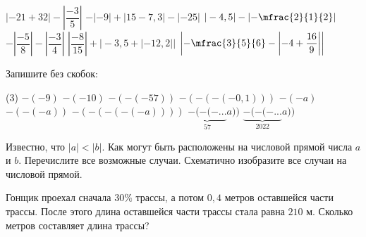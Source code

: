 \begin{class}[number=3]
\begin{listofex}[resume]
\begin{tasks}
			\task \( |-21+32| - \left|\dfrac{-3}{5}\right|  \)
			\task \( -|-9|+|15-7,3|-|-25|  \)
			\task \(  |-4,5|-\left|-\mfrac{2}{1}{2}\right| \)
			\task \(  -\left| \dfrac{-5}{8} \right|-\left|\dfrac{-3}{4}\right| \)
			\task \(  \left|\dfrac{-8}{15}\right| + \bigl|-3,5+|-12,2|| \)
			\task \(  \left|-\mfrac{3}{5}{6} - \left|-4+\dfrac{16}{9}\right|\right| \)
		\end{tasks}
		\item Запишите без скобок:
		\begin{tasks}(3)
			\task \( -(-9) \)
			\task \( -(-10) \)
			\task \( -(-(-57)) \)
			\task \( -(-(-(-0,1))) \)
			\task \( -(-a) \)
			\task \( -(-(-a)) \)
			\task \( -(-(-(-(-a)))) \)
			\task \( \underbrace{-(-(-...}_{57}a)) \)
			\task \( \underbrace{-(-(-...}_{2022}a)) \)
		\end{tasks}
		\item Известно, что \( |a|<|b| \). Как могут быть расположены на числовой прямой числа \( a \) и \( b \). Перечислите все возможные случаи. Схематично изобразите все случаи на числовой прямой.
		\item Гонщик проехал сначала \(30\%\) трассы, а потом \(0,4\) метров оставшейся части трассы. После этого длина оставшейся части трассы стала равна \(210\) м. Сколько метров составляет длина трассы?
	\end{listofex}
\end{class}

